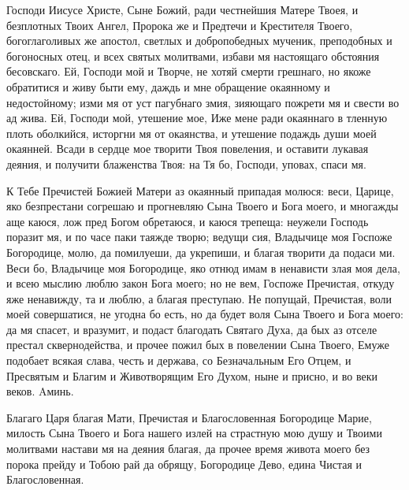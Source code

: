 

Господи Иисусе Христе, Сыне Божий, ради честнейшия Матере Твоея, и безплотных Твоих Ангел, Пророка же и Предтечи и Крестителя Твоего, богоглаголивых же апостол, светлых и добропобедных мученик, преподобных и богоносных отец, и всех святых молитвами, избави мя настоящаго обстояния бесовскаго. Ей, Господи мой и Творче, не хотяй смерти грешнаго, но якоже обратитися и живу быти ему, даждь и мне обращение окаянному и недостойному; изми мя от уст пагубнаго змия, зияющаго пожрети мя и свести во ад жива. Ей, Господи мой, утешение мое, Иже мене ради окаяннаго в тленную плоть оболкийся, исторгни мя от окаянства, и утешение подаждь души моей окаянней. Всади в сердце мое творити Твоя повеления, и оставити лукавая деяния, и получити блаженства Твоя: на Тя бо, Господи, уповах, спаси мя.




К Тебе Пречистей Божией Матери аз окаянный припадая молюся: веси, Царице, яко безпрестани согрешаю и прогневляю Сына Твоего и Бога моего, и многажды аще каюся, лож пред Богом обретаюся, и каюся трепеща: неужели Господь поразит мя, и по часе паки таяжде творю; ведущи сия, Владычице моя Госпоже Богородице, молю, да помилуеши, да укрепиши, и благая творити да подаси ми. Веси бо, Владычице моя Богородице, яко отнюд имам в ненависти злая моя дела, и всею мыслию люблю закон Бога моего; но не вем, Госпоже Пречистая, откуду яже ненавижду, та и люблю, а благая преступаю. Не попущай, Пречистая, воли моей совершатися, не угодна бо есть, но да будет воля Сына Твоего и Бога моего: да мя спасет, и вразумит, и подаст благодать Святаго Духа, да бых аз отселе престал сквернодейства, и прочее пожил бых в повелении Сына Твоего, Емуже подобает всякая слава, честь и держава, со Безначальным Его Отцем, и Пресвятым и Благим и Животворящим Его Духом, ныне и присно, и во веки веков. Aминь.




Благаго Царя благая Мати, Пречистая и Благословенная Богородице Марие, милость Сына Твоего и Бога нашего излей на страстную мою душу и Твоими молитвами настави мя на деяния благая, да прочее время живота моего без порока прейду и Тобою рай да обрящу, Богородице Дево, едина Чистая и Благословенная.




